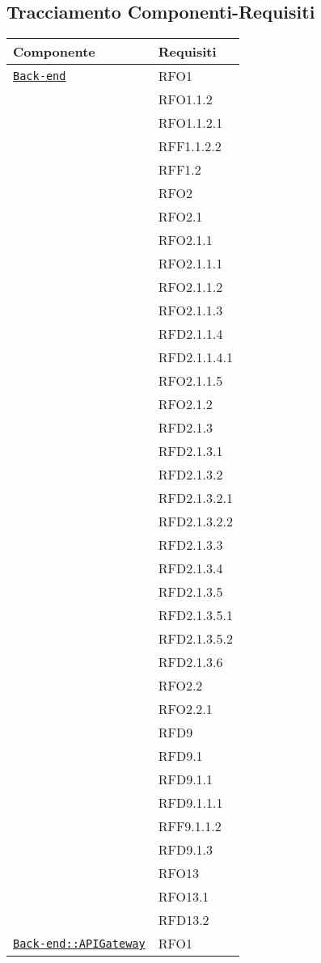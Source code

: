 \subsection{Tracciamento Componenti-Requisiti}
\normalsize
\begin{longtable}{|>{\centering}m{10cm}|m{3cm}<{\centering}|}
\hline 
\textbf{Componente} & \textbf{Requisiti}\\
\hline
\endhead
\hyperref[Back-end]{\texttt{Back-end}} & RFO1\\
& RFO1.1.2\\
& RFO1.1.2.1\\
& RFF1.1.2.2\\
& RFF1.2\\
& RFO2\\
& RFO2.1\\
& RFO2.1.1\\
& RFO2.1.1.1\\
& RFO2.1.1.2\\
& RFO2.1.1.3\\
& RFD2.1.1.4\\
& RFD2.1.1.4.1\\
& RFO2.1.1.5\\
& RFO2.1.2\\
& RFD2.1.3\\
& RFD2.1.3.1\\
& RFD2.1.3.2\\
& RFD2.1.3.2.1\\
& RFD2.1.3.2.2\\
& RFD2.1.3.3\\
& RFD2.1.3.4\\
& RFD2.1.3.5\\
& RFD2.1.3.5.1\\
& RFD2.1.3.5.2\\
& RFD2.1.3.6\\
& RFO2.2\\
& RFO2.2.1\\
& RFD9\\
& RFD9.1\\
& RFD9.1.1\\
& RFD9.1.1.1\\
& RFF9.1.1.2\\
& RFD9.1.3\\
& RFO13\\
& RFO13.1\\
& RFD13.2\\ \hline

\hyperref[Back-end::APIGateway]{\texttt{Back-end::APIGateway}} & RFO1\\ \hline


\end{longtable}
